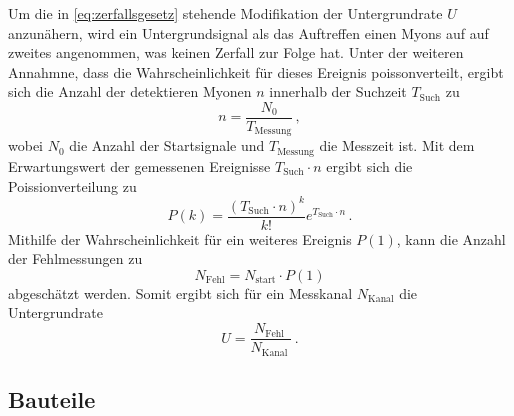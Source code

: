 Um die in \autoref{eq:zerfallsgesetz} stehende Modifikation der Untergrundrate $U$ anzunähern,
wird ein Untergrundsignal als das Auftreffen einen Myons auf auf zweites angenommen,
was keinen Zerfall zur Folge hat.
Unter der weiteren Annahmne, 
dass die Wahrscheinlichkeit für dieses Ereignis poissonverteilt, 
ergibt sich die Anzahl der detektieren Myonen $n$ innerhalb der Suchzeit $T_\text{Such}$ zu
\begin{equation*}
    n=\frac{N_{0}}{T_{\text{Messung}}} \, ,
\end{equation*}
wobei $N_0$ die Anzahl der Startsignale und $T_{\text{Messung}}$ die Messzeit ist.
Mit dem Erwartungswert der gemessenen Ereignisse $T_\text{Such} \cdot n$ ergibt sich die Poissionverteilung zu
\begin{equation*}
    P(k)=\frac{\left(T_{\mathrm{Such}} \cdot n\right)^k}{k !} e^{T_{ \mathrm{Such}} \cdot n} \, .
\end{equation*}
Mithilfe der Wahrscheinlichkeit für ein weiteres Ereignis $P(1)$, 
kann die Anzahl der Fehlmessungen zu
\begin{equation*}
    N_{\mathrm{Fehl}}=N_{\mathrm{start}} \cdot P(1)
\end{equation*}
abgeschätzt werden.
Somit ergibt sich für ein Messkanal $N_\text{Kanal}$ die Untergrundrate
\begin{equation}\label{eq:untergrundrate}
    U=\frac{N_{\text {Fehl }}}{N_{\text {Kanal }}} \, .
\end{equation}


\subsection{Bauteile}
\label{sec:Bauteile}

